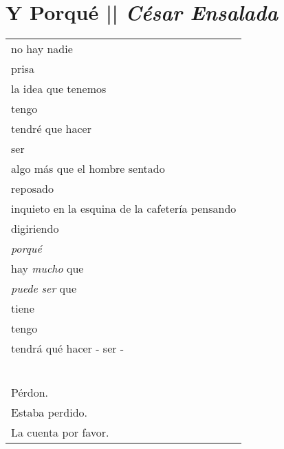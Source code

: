 \section[Y Porqué]{Y Porqué || \emph{César Ensalada} \hspace*{\fill}  \thepage}
\vspace*{0.75cm}
\begin{center}
\begin{tabular}{l}
no hay nadie \\
\hspace{9.5mm} prisa \\
\hspace{9.5mm} la idea que tenemos \\
\hspace{26mm} tengo \\
\hspace{26mm} tendré que hacer \\
\hspace{43mm}ser \\
algo más que el hombre sentado\\
\hspace{33mm} reposado\\
\hspace{33mm} inquieto en la esquina de la cafetería pensando \\
\hspace{84.5mm} digiriendo \\
\hspace{70mm}\emph{porqué} \\
\hspace{50mm} hay \emph{mucho} que\\
\hspace{50mm} \emph{puede ser} que\\
\hspace{70mm} tiene \\
\hspace{70mm} tengo\\
\hspace{70mm} tendrá qué hacer
\hspace{2.25mm} -
\hspace{2.25mm} ser - \\

\-\ \\ \\Pérdon.\\
Estaba perdido.\\
La cuenta por favor.

\end{tabular}
\end{center}
